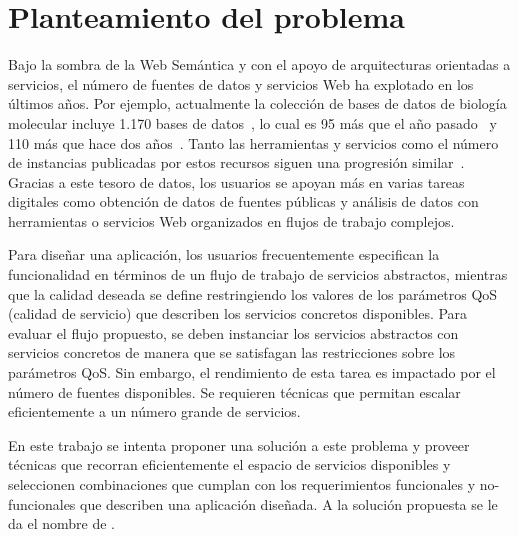 \section{Planteamiento del problema}

Bajo la sombra de la Web Semántica y con el apoyo de arquitecturas orientadas a
servicios, el número de fuentes de datos y servicios Web ha explotado en los
últimos años. Por ejemplo, actualmente la colección de bases de datos de
biología molecular incluye 1.170 bases de datos~\cite{Galperin09}, lo cual es 95
más que el año pasado~\cite{Galperin2008} y 110 más que hace dos
años~\cite{Galperin2007}. Tanto las herramientas y servicios como el número de
instancias publicadas por estos recursos siguen una progresión
similar~\cite{Benson07}. Gracias a este tesoro de datos, los usuarios se apoyan
más en varias tareas digitales como obtención de datos de fuentes públicas y
análisis de datos con herramientas o servicios Web organizados en flujos de
trabajo complejos.

Para diseñar una aplicación, los usuarios frecuentemente especifican la
funcionalidad en términos de un flujo de trabajo de servicios abstractos,
mientras que la calidad deseada se define restringiendo los valores de los
parámetros QoS (calidad de servicio) que describen los servicios concretos
disponibles. Para evaluar el flujo propuesto, se deben instanciar los servicios
abstractos con servicios concretos de manera que se satisfagan las restricciones
sobre los
parámetros QoS. Sin embargo, el rendimiento de esta tarea es impactado por el
número de fuentes disponibles. Se requieren técnicas que permitan escalar
eficientemente a un número grande de servicios.

En este trabajo se intenta proponer una solución a este problema y proveer
técnicas que recorran eficientemente el espacio de servicios disponibles y
seleccionen combinaciones que cumplan con los requerimientos funcionales y
no-funcionales que describen una aplicación diseñada. A la solución propuesta se
le da el nombre de \mcdsatc.

